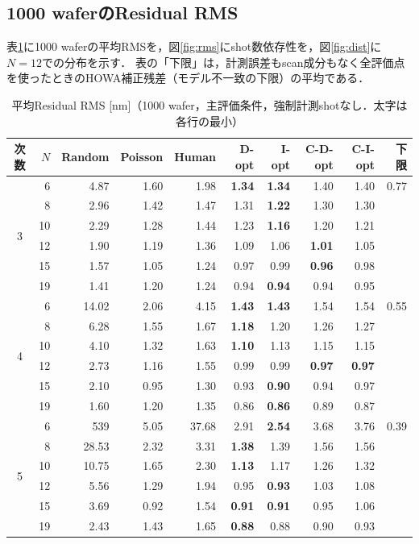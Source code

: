 \documentclass[10.5pt,a4paper]{ltjsarticle}
\begin{document}
\subsection{1000 waferのResidual RMS}

表\ref{tab:rms}に1000 waferの平均RMSを，図\ref{fig:rms}にshot数依存性を，図\ref{fig:dist}に$N=12$での分布を示す．
表の「下限」は，計測誤差もscan成分もなく全評価点を使ったときのHOWA補正残差（モデル不一致の下限）の平均である．

\begin{table}[htbp]
  \centering
  \caption{平均Residual RMS [nm]（1000 wafer，主評価条件，強制計測shotなし．太字は各行の最小）}
  \label{tab:rms}
  \small
\begin{tabular}{crrrrrrrrr}
\toprule
次数 & $N$ & Random & Poisson & Human & D-opt & I-opt & C-D-opt & C-I-opt & 下限 \\
\midrule
\multirow{6}{*}{3} & 6 & 4.87 & 1.60 & 1.98 & \textbf{1.34} & \textbf{1.34} & 1.40 & 1.40 & 0.77 \\
 & 8 & 2.96 & 1.42 & 1.47 & 1.31 & \textbf{1.22} & 1.30 & 1.30 &  \\
 & 10 & 2.29 & 1.28 & 1.44 & 1.23 & \textbf{1.16} & 1.20 & 1.21 &  \\
 & 12 & 1.90 & 1.19 & 1.36 & 1.09 & 1.06 & \textbf{1.01} & 1.05 &  \\
 & 15 & 1.57 & 1.05 & 1.24 & 0.97 & 0.99 & \textbf{0.96} & 0.98 &  \\
 & 19 & 1.41 & 1.20 & 1.24 & 0.94 & \textbf{0.94} & 0.94 & 0.95 &  \\
\midrule
\multirow{6}{*}{4} & 6 & 14.02 & 2.06 & 4.15 & \textbf{1.43} & \textbf{1.43} & 1.54 & 1.54 & 0.55 \\
 & 8 & 6.28 & 1.55 & 1.67 & \textbf{1.18} & 1.20 & 1.26 & 1.27 &  \\
 & 10 & 4.10 & 1.32 & 1.63 & \textbf{1.10} & 1.13 & 1.15 & 1.15 &  \\
 & 12 & 2.73 & 1.16 & 1.55 & 0.99 & 0.99 & \textbf{0.97} & \textbf{0.97} &  \\
 & 15 & 2.10 & 0.95 & 1.30 & 0.93 & \textbf{0.90} & 0.94 & 0.97 &  \\
 & 19 & 1.60 & 1.20 & 1.35 & 0.86 & \textbf{0.86} & 0.89 & 0.87 &  \\
\midrule
\multirow{6}{*}{5} & 6 & 539 & 5.05 & 37.68 & 2.91 & \textbf{2.54} & 3.68 & 3.76 & 0.39 \\
 & 8 & 28.53 & 2.32 & 3.31 & \textbf{1.38} & 1.39 & 1.56 & 1.56 &  \\
 & 10 & 10.75 & 1.65 & 2.30 & \textbf{1.13} & 1.17 & 1.26 & 1.32 &  \\
 & 12 & 5.56 & 1.29 & 1.94 & 0.95 & \textbf{0.93} & 1.03 & 1.08 &  \\
 & 15 & 3.69 & 0.92 & 1.54 & \textbf{0.91} & \textbf{0.91} & 0.95 & 1.06 &  \\
 & 19 & 2.43 & 1.43 & 1.65 & \textbf{0.88} & 0.88 & 0.90 & 0.93 &  \\
\bottomrule
\end{tabular}
\end{table}
\end{document}
